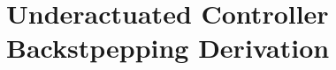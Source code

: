\chapter{Underactuated Controller Backstpepping Derivation}
\makeatletter{}\makeatother
\label{appen:derivations_nadafi_backstepping}






